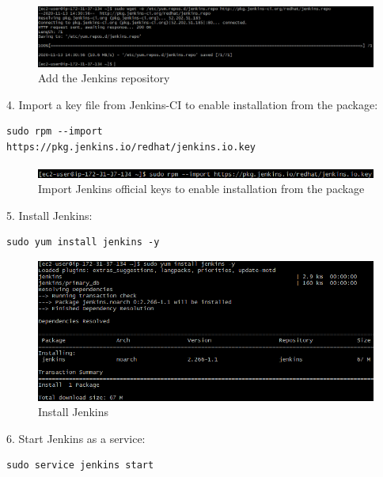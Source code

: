 \documentclass[12pt,a4paper,twoside]{article}
\begin{document}
\begin{figure}[h!]
    \centering
        \includegraphics[width=15cm]{images-aws/16-download-jenkins.png}
        \caption{Add the Jenkins repository}
\end{figure}

4. Import a key file from Jenkins-CI to enable installation from the package:

\begin{verbatim}
sudo rpm --import
https://pkg.jenkins.io/redhat/jenkins.io.key
\end{verbatim}

\begin{figure}[h!]
    \centering
        \includegraphics[width=15cm]{images-aws/17-import-jenkins-keys.png}
        \caption{Import Jenkins official keys to enable installation from the package}
\end{figure}

5. Install Jenkins:

\begin{verbatim}
sudo yum install jenkins -y
\end{verbatim}

\begin{figure}[h!]
    \centering
        \includegraphics[width=15cm]{images-aws/18-install-jenkins.png}
        \caption{Install Jenkins}
\end{figure}

6. Start Jenkins as a service:

\begin{verbatim}
sudo service jenkins start
\end{verbatim}
\end{document}
